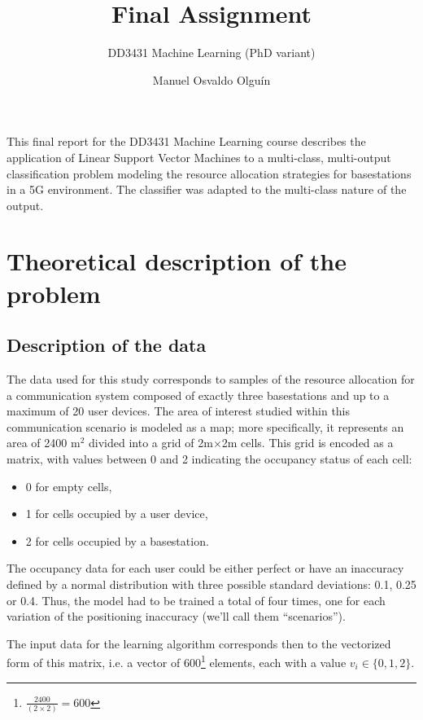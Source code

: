 \documentclass{kthreport}
\title{Final Assignment}
\subtitle{DD3431 Machine Learning (PhD variant)}
\author{Manuel Osvaldo Olguín}
\theoremstyle{definition}
\begin{document}
\maketitle

This final report for the DD3431 Machine Learning course describes the application of Linear Support Vector Machines to a multi-class, multi-output classification problem modeling the resource allocation strategies for basestations in a 5G environment. The classifier was adapted to the multi-class nature of the output.

\section{Theoretical description of the problem}

\subsection{Description of the data}\label{sec:data}

The data used for this study corresponds to samples of the resource allocation for a communication system composed of exactly three basestations and up to a maximum of 20 user devices. The area of interest studied within this communication scenario is modeled as a map; more specifically, it represents an area of 2400 m$^{2}$ divided into a grid of 2m$\times$2m cells. This grid is encoded as a matrix, with values between 0 and 2 indicating the occupancy status of each cell:
\begin{itemize}
	\item 0 for empty cells,
	\item 1 for cells occupied by a user device,
	\item 2 for cells occupied by a basestation.
\end{itemize}

The occupancy data for each user could be either perfect or have an inaccuracy defined by a normal distribution with three possible standard deviations: 0.1, 0.25 or 0.4. Thus, the model had to be trained a total of four times, one for each variation of the positioning inaccuracy (we'll call them ``scenarios''). 

The input data for the learning algorithm corresponds then to the vectorized form of this matrix, i.e. a vector of 600\footnote{$\frac{2400}{(2\times2)} = 600$} elements, each with a value $v_i \in \{0, 1, 2\}$.
\end{document}
